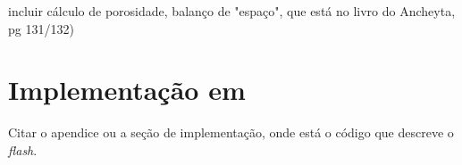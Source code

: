 incluir cálculo de porosidade, balanço de "espaço", que está no livro do
Ancheyta, pg 131/132)

\section{Implementação em \emso} \label{sec:implementacao}

Citar o apendice ou a seção de implementação, onde está o código
que descreve o \emph{flash}.





































